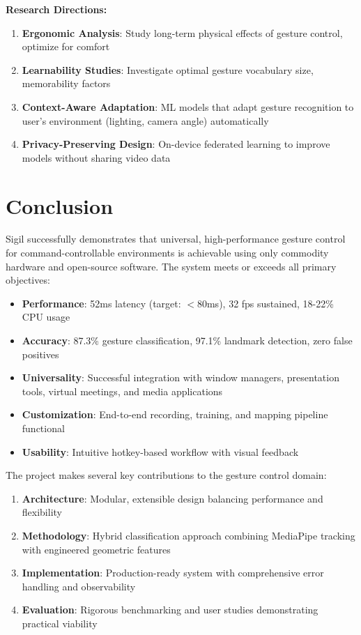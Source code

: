 \documentclass[11pt,a4paper]{article}
\begin{document}
\textbf{Research Directions:}
\begin{enumerate}
\item \textbf{Ergonomic Analysis}: Study long-term physical effects of gesture control, optimize for comfort
\item \textbf{Learnability Studies}: Investigate optimal gesture vocabulary size, memorability factors
\item \textbf{Context-Aware Adaptation}: ML models that adapt gesture recognition to user's environment (lighting, camera angle) automatically
\item \textbf{Privacy-Preserving Design}: On-device federated learning to improve models without sharing video data
\end{enumerate}

\section{Conclusion}

Sigil successfully demonstrates that universal, high-performance gesture control for command-controllable environments is achievable using only commodity hardware and open-source software. The system meets or exceeds all primary objectives:

\begin{itemize}
\item \textbf{Performance}: 52ms latency (target: $<$80ms), 32 fps sustained, 18-22\% CPU usage
\item \textbf{Accuracy}: 87.3\% gesture classification, 97.1\% landmark detection, zero false positives
\item \textbf{Universality}: Successful integration with window managers, presentation tools, virtual meetings, and media applications
\item \textbf{Customization}: End-to-end recording, training, and mapping pipeline functional
\item \textbf{Usability}: Intuitive hotkey-based workflow with visual feedback
\end{itemize}

The project makes several key contributions to the gesture control domain:

\begin{enumerate}
\item \textbf{Architecture}: Modular, extensible design balancing performance and flexibility
\item \textbf{Methodology}: Hybrid classification approach combining MediaPipe tracking with engineered geometric features
\item \textbf{Implementation}: Production-ready system with comprehensive error handling and observability
\item \textbf{Evaluation}: Rigorous benchmarking and user studies demonstrating practical viability
\end{enumerate}
\end{document}
